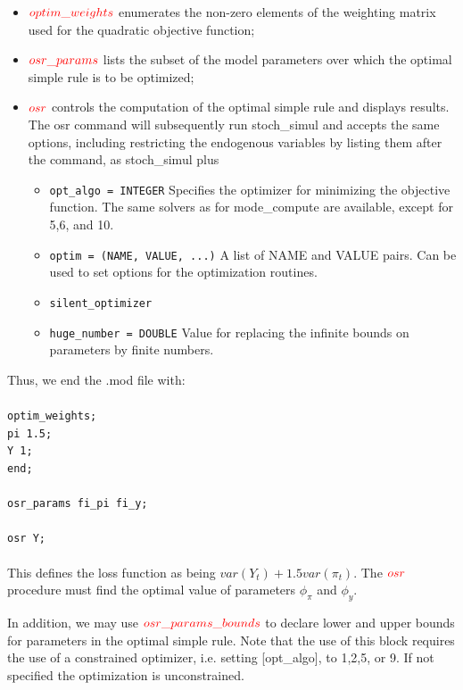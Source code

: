 \documentclass[10pt,math=newtx,citestyle=gb7714-2015,bibstyle=gb7714-2015]{elegantbook}
\begin{document}
{	\begin{itemize}
		\item $\textcolor{red}{optim\_weights}$ enumerates the non-zero elements of the weighting matrix used for the quadratic objective function;
		\item $\textcolor{red}{osr\_params}$ lists the subset of the model parameters over which the optimal simple rule is to be optimized;
		\item $\textcolor{red}{osr}$ controls the computation of the optimal simple rule and displays results.\\
		The osr command will subsequently run stoch\_simul and accepts the same options, including restricting the endogenous variables by listing them after the command, as stoch\_simul plus
		\begin{itemize}
			\item \texttt{opt\_algo = INTEGER} Specifies the optimizer for minimizing the objective function. The same solvers as for mode\_compute are available, except for 5,6, and 10.
			\item \texttt{optim = (NAME, VALUE, ...)} A list of NAME and VALUE pairs. Can be used to set options for the optimization routines.
			\item \texttt{silent\_optimizer}
			\item \texttt{huge\_number = DOUBLE} Value for replacing the infinite bounds on parameters by finite numbers.
		\end{itemize}
	\end{itemize}
	
	Thus, we end the .mod file with:\\
	\\
	\texttt{optim\_weights;\\
		pi 1.5;\\
		Y 1;\\
		end;\\
		\\
		osr\_params fi\_pi fi\_y;\\
		\\
		osr Y;}\\
	\\
	
	This defines the loss function as being $var(Y_t)+1.5var(\pi_t)$. The $\textcolor{red}{osr}$ procedure must find the optimal value of parameters $\phi_{\pi}$ and $\phi_{y}$.
	
	In addition, we may use $\textcolor{red}{osr\_params\_bounds}$ to declare lower and upper bounds for parameters in the optimal simple rule. Note that the use of this block requires the use of a constrained optimizer, i.e. setting [opt\_algo], to 1,2,5, or 9. If not specified the optimization is unconstrained.
	
}
\end{document}

